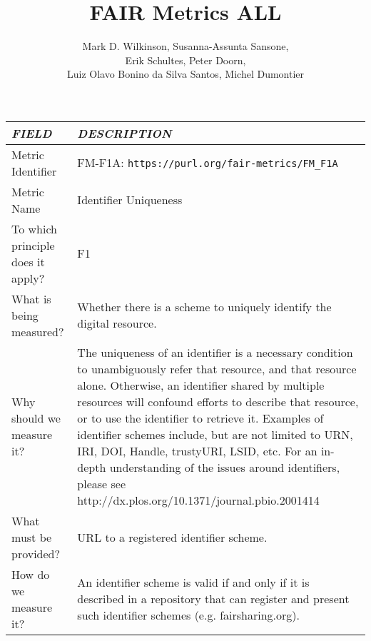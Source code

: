 \documentclass[english]{article}
\begin{document}
\title{FAIR Metrics ALL}

\author{Mark D. Wilkinson, Susanna-Assunta Sansone, \\Erik Schultes, Peter Doorn,\\ 
Luiz Olavo Bonino da Silva Santos, Michel Dumontier}

\maketitle

\newpage


\thispagestyle{fancy}


\centering

\begin{longtable}{|p{5cm}|p{9cm}|}

\hline
\emph{FIELD} & \emph{DESCRIPTION} \\

\hline
Metric Identifier &   FM-F1A: \verb"https://purl.org/fair-metrics/FM_F1A"
\\


\hline
Metric Name &   Identifier Uniqueness \\



\hline
To which principle does it apply? &   F1\\



\hline
What is being measured? & Whether there is a scheme to uniquely identify the digital resource.\\



\hline
Why should we measure it? & 
The uniqueness of an identifier is a necessary condition to unambiguously refer that resource, and that resource alone. Otherwise, an identifier shared by multiple resources will confound efforts to describe that resource, or to use the identifier to retrieve it. Examples of identifier schemes include, but are not limited to URN, IRI, DOI, Handle, trustyURI, LSID, etc. For an in-depth understanding of the issues around identifiers, please see http://dx.plos.org/10.1371/journal.pbio.2001414  
\\



\hline
What must be provided? &  URL to a registered identifier scheme. \\



\hline
How do we measure it? &  
An identifier scheme is valid if and only if it is described in a repository that can register and present such identifier schemes (e.g. fairsharing.org). 


\end{longtable}
\end{document}
